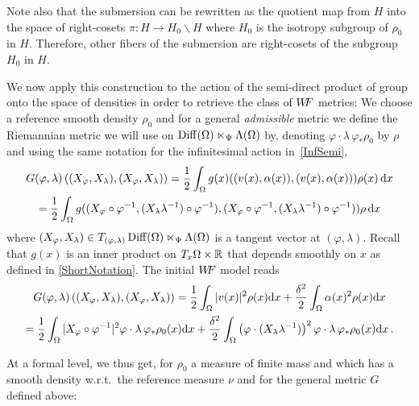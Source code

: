  Note also that the submersion can be rewritten as the quotient map from $H$ into the space of right-cosets $\pi: H \to H_0\backslash H$ where $H_0$ is the isotropy subgroup of $\rho_0$ in $H$. Therefore, other fibers of the submersion are right-cosets of the subgroup $H_0$ in $H$. 





We now apply this construction to the action of the semi-direct product of group onto the space of densities in order to retrieve the class of $W\! \! F$ metrics: We choose a reference smooth density $\rho_0$ and for a general \textit{admissible} metric we define the Riemannian metric we will use on $\operatorname{Diff}(\Omega) \ltimes_\Psi \Lambda(\Omega)$ by, denoting $\varphi \cdot \lambda \, \varphi_*\rho_0$ by $\rho$ and using the same notation for the infinitesimal action in~\eqref{InfSemi},
\begin{multline}
G(\varphi,\lambda)\left((X_\varphi,X_\lambda) , (X_\varphi,X_\lambda)\right)= \frac{1}{2} \int_{\Omega} g(x)((v(x),\alpha(x)),(v(x),\alpha(x))) \rho(x) \, \mathrm{d} x  \\
= \frac{1}{2} \int_{\Omega} g((X_\varphi \circ \varphi^{-1},(X_\lambda \lambda^{-1}) \circ \varphi^{-1}),(X_\varphi \circ \varphi^{-1},(X_\lambda \lambda^{-1}) \circ \varphi^{-1})) \rho \,\mathrm{d} x  
\end{multline}
where $(X_\varphi,X_\lambda) \in T_{(\varphi,\lambda)}\operatorname{Diff}(\Omega) \ltimes_\Psi \Lambda(\Omega)$ is a tangent vector at $(\varphi,\lambda)$. Recall that $g(x)$ is an inner product on $T_x\Omega \times \mathbb{R}$ that depends smoothly on $x$ as defined in \eqref{ShortNotation}.
The initial $W\! \! F$ model reads
\begin{multline}
G(\varphi,\lambda)\left((X_\varphi,X_\lambda) , (X_\varphi,X_\lambda)\right)= \frac{1}{2} \int_{\Omega} | v(x)  |^2 \rho(x) \mathrm{d} x + \frac{\delta^2}{2} \int_{\Omega}   \alpha(x)^2  \rho(x) \mathrm{d} x \\
= \frac{1}{2} \int_{\Omega} | X_\varphi \circ \varphi^{-1}  |^2 \varphi \cdot \lambda \, \varphi_* \rho_0(x) \mathrm{d} x + \frac{\delta^2}{2}   \int_{\Omega} \left( \varphi \cdot (X_\lambda \lambda^{-1}) \right)^2 \varphi \cdot \lambda \,  \varphi_* \rho_0(x) \mathrm{d} x\,.
\end{multline}





At a formal level, we thus get, for $\rho_0$ a measure of finite mass and which has a smooth density w.r.t.\ the reference measure $\nu$ and for the general metric $G$ defined above:

